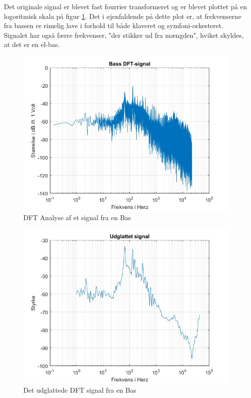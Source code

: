 Det originale signal er blevet fast fourrier transformeret og er blevet plottet på en logoritmisk skala på figur \ref{fig:Bas DFT}. Det i øjenfaldende på dette plot er, at frekvenserne fra bassen er rimelig lave i forhold til både klaveret og symfoni-orkesteret. Signalet har også færre frekvenser, "der stikker ud fra mængden", hviket skyldes, at det er en el-bas.

\begin{figure}[H]
	\centering
	\includegraphics[width=140mm]{figures/Bass/DFT.jpg}
	\caption{DFT Analyse af et signal fra en Bas}
	\label{fig:Bas DFT}
\end{figure}

\begin{figure}[H]
	\centering
	\includegraphics[width=140mm]{figures/Bass/udglattet.jpg}
	\caption{Det udglattede DFT signal fra en Bas}
	\label{fig:Bas udglattet}
\end{figure}



